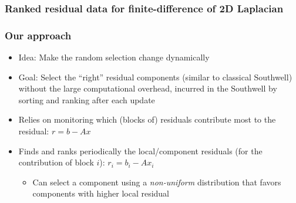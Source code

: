 \documentclass{beamer}
\begin{document}
\begin{frame}
	\frametitle{Ranked residual data for finite-difference of 2D Laplacian}
	\begin{figure}[H]
		\centering
	\end{figure}
\end{frame}


\begin{frame}
	\frametitle{Our approach}
	\begin{itemize}
		\item Idea: Make the random selection change dynamically 
		\item Goal: Select the ``right'' residual components (similar to classical Southwell) without the large computational overhead, incurred in the Southwell  by sorting and ranking after each update
		\item Relies on monitoring which (blocks of) residuals contribute most to the residual: $r = b - Ax$
		\item Finds and ranks periodically the local/component residuals (for the contribution of block $i$): $r_i = b_i - Ax_i $
			\begin{itemize}
	            \item Can select a component using a {\it non-uniform} distribution that favors components with higher local residual
	        \end{itemize}
	\end{itemize}
\end{frame}
\end{document}
